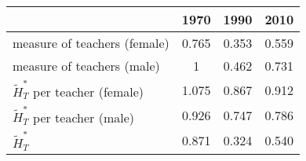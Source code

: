 \begin{table}
  \centering \begin{tabular}{lccc}
\toprule
& 1970 & 1990 & 2010 \\
\midrule
measure of teachers (female) & 0.765 & 0.353 &0.559\\
measure of teachers (male) & 1 & 0.462 & 0.731\\
$\widetilde{H}_T^*$ per teacher (female)   & 1.075 & 0.867 & 0.912 \\
$\widetilde{H}_T^*$ per teacher (male)   & 0.926 & 0.747 & 0.786 \\
$\widetilde{H}_T^*$ & 0.871  & 0.324 & 0.540 \\
\bottomrule
\end{tabular}
  \label{ }
\end{table}